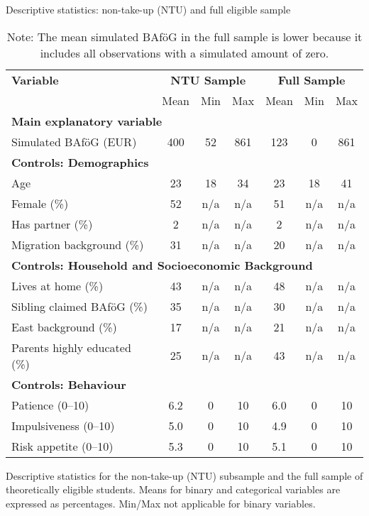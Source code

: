 \begin{table}[H]
\footnotesize
\caption*{Descriptive statistics: non-take-up (NTU) and full eligible sample}
\centering
\begin{tabular}{lccc|ccc}
\toprule
\textbf{Variable} & \multicolumn{3}{c|}{\textbf{NTU Sample}} & \multicolumn{3}{c}{\textbf{Full Sample}} \\
& Mean & Min & Max & Mean & Min & Max \\
\midrule
\multicolumn{7}{l}{\textbf{Main explanatory variable}} \\
Simulated BAföG (EUR)       & 400    & 52    & 861   & 123    & 0    & 861   \\
\midrule
\multicolumn{7}{l}{\textbf{Controls: Demographics}} \\
Age                         & 23     & 18    & 34    & 23     & 18   & 41    \\
Female (\%)                 & 52     & n/a   & n/a   & 51     & n/a  & n/a   \\
Has partner (\%)            & 2      & n/a   & n/a   & 2      & n/a  & n/a   \\
Migration background (\%)   & 31     & n/a   & n/a   & 20     & n/a  & n/a   \\
\midrule
\multicolumn{7}{l}{\textbf{Controls: Household and Socioeconomic Background}} \\
Lives at home (\%)          & 43     & n/a   & n/a   & 48     & n/a  & n/a   \\
Sibling claimed BAföG (\%)  & 35     & n/a   & n/a   & 30     & n/a  & n/a   \\
East background (\%)        & 17     & n/a   & n/a   & 21     & n/a  & n/a   \\
Parents highly educated (\%)& 25     & n/a   & n/a   & 43     & n/a  & n/a   \\
\midrule
\multicolumn{7}{l}{\textbf{Controls: Behaviour}} \\
Patience (0--10)            & 6.2    & 0     & 10    & 6.0    & 0    & 10    \\
Impulsiveness (0--10)       & 5.0    & 0     & 10    & 4.9    & 0    & 10    \\
Risk appetite (0--10)       & 5.3    & 0     & 10    & 5.1    & 0    & 10    \\
\bottomrule
\end{tabular}
\caption{\small{Descriptive statistics for the non-take-up (NTU) subsample and the full sample of theoretically eligible students. Means for binary and categorical variables are expressed as percentages. Min/Max not applicable for binary variables.}}
\caption*{\small{Note: The mean simulated BAföG in the full sample is lower because it includes all observations with a simulated amount of zero.}}
\label{tab:descriptive_ntu_all}
\end{table}
